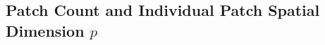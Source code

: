 \documentclass[pdflatex,sn-mathphys-num]{sn-jnl}%
\theoremstyle{thmstyleone}%
\theoremstyle{thmstyletwo}%
\theoremstyle{thmstylethree}%
\begin{document}



\subsection{Patch Count and Individual Patch Spatial Dimension $p$}
\end{document}
